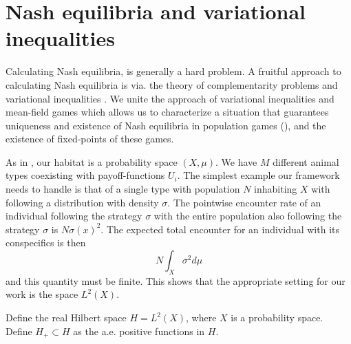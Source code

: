 \section{Nash equilibria and variational inequalities}
Calculating Nash equilibria,  is generally a hard problem. A fruitful approach to calculating Nash equilibria is via. the theory of complementarity problems and variational inequalities \citep{karamardian1969nonlinear,nabetani2011parametrized}. We unite the approach of variational inequalities and mean-field games which allows us to characterize a situation that guarantees uniqueness and existence of Nash equilibria in population games (), and the existence of fixed-points of these games.


As in , our habitat is a probability space $(X,\mu)$. We have $M$ different animal types coexisting with payoff-functions $U_i$. The simplest example our framework needs to handle is that of a single type with population $N$ inhabiting $X$ with following a distribution with density $\sigma$. The pointwise encounter rate of an individual following the strategy $\sigma$ with the entire population also following the strategy $\sigma$ is $N\sigma(x)^2$. The expected total encounter for an individual with its conspecifics is then
\begin{equation}
  N\int_X \sigma^2 d\mu
\end{equation}
and this quantity must be finite. This shows that the appropriate setting for our work is the space $L^2(X)$.
\begin{definition}
  Define the real Hilbert space $H=L^2(X)$, where $X$ is a probability space. Define $H_+ \subset H$ as the a.e. positive functions in $H$.
\end{definition}

